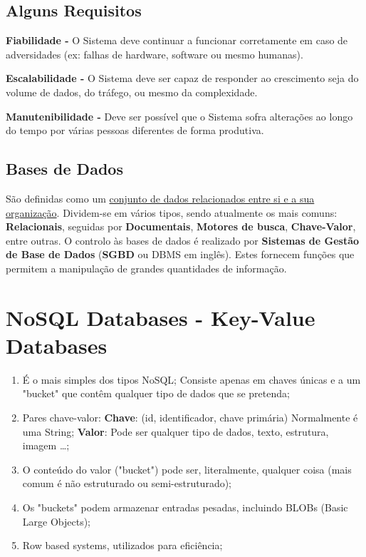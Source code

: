 \documentclass{article}
\begin{document}
\subsection{Alguns Requisitos}

\begin{flushleft}
  \item \textbf{Fiabilidade -} O Sistema deve continuar a funcionar corretamente em caso de adversidades (ex: falhas de hardware, software ou mesmo humanas).
  \item \textbf{Escalabilidade -} O Sistema deve ser capaz de responder ao crescimento seja do volume de dados, do tráfego, ou mesmo da complexidade.
  \item \textbf{Manutenibilidade -} Deve ser possível que o Sistema sofra alterações ao longo do tempo por várias pessoas diferentes de forma produtiva.
\end{flushleft}

\pagebreak

\subsection{Bases de Dados}

\begin{flushleft}
  São definidas como um \uline{conjunto de dados relacionados entre si e a sua organização}.
  \vspace{2mm}
  Dividem-se em vários tipos, sendo atualmente os mais comuns: \textbf{Relacionais}, seguidas por
  \textbf{Documentais}, \textbf{Motores de busca}, \textbf{Chave-Valor}, entre outras. 
  \vspace{2mm}
  O controlo às bases de dados é realizado por \textbf{Sistemas de Gestão de Base de Dados} (\textbf{SGBD}
  ou DBMS em inglês). Estes fornecem funções que permitem a manipulação de grandes
  quantidades de informação.
\end{flushleft}

\section{NoSQL Databases - Key-Value Databases}

\begin{flushleft}
  \begin{enumerate}
    \item É o mais simples dos tipos NoSQL;
    \subitem Consiste apenas em chaves únicas e a um "bucket" que contêm qualquer tipo de dados que se pretenda;
    \item Pares chave-valor:
    \subitem \textbf{Chave}: (id, identificador, chave primária) Normalmente é uma String;
    \subitem \textbf{Valor}: Pode ser qualquer tipo de dados, texto, estrutura, imagem \dots;
    \item O conteúdo do valor ("bucket") pode ser, literalmente, qualquer coisa (mais comum é não estruturado ou semi-estruturado);
    \item Os "buckets" podem armazenar entradas pesadas, incluindo BLOBs (Basic Large Objects);
    \item Row based systems, utilizados para eficiência;
  \end{enumerate}
\end{flushleft}
\end{document}
